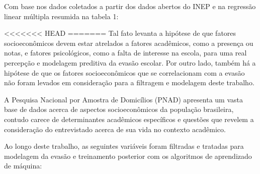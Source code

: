 \documentclass[english, spanish, brazilian]{RBIEarticle} %
\begin{document}
Com base nos dados coletados a partir dos dados abertos do INEP e na regressão linear múltipla resumida na tabela 1:

<<<<<<< HEAD
=======
Tal fato levanta a hipótese de que fatores socioeconômicos devem estar atrelados a fatores acadêmicos, como a presença ou notas, e fatores psicológicos, como a falta de interesse na escola, para uma real percepção e modelagem preditiva da evasão escolar. Por outro lado, também há a hipótese de que os fatores socioeconômicos que se correlacionam com a evasão não foram levados em consideração para a filtragem e modelagem deste trabalho.

A Pesquisa Nacional por Amostra de Domicílios (PNAD) apresenta um vasta base de dados acerca de aspectos socioeconômicos da população brasileira, contudo carece de determinantes acadêmicos específicos e questões que revelem a consideração do entrevistado acerca de sua vida no contexto acadêmico. 

Ao longo deste trabalho, as seguintes variáveis foram filtradas e tratadas para modelagem da evasão e treinamento posterior com os algoritmos de aprendizado de máquina:
\end{document}
